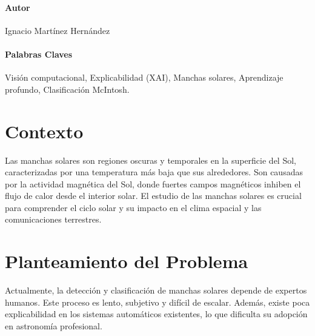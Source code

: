 \documentclass[conference]{IEEEtran}
\begin{document}

\paragraph*{Autor}{Ignacio Martínez Hernández}
\paragraph*{Palabras Claves}{Visión computacional, Explicabilidad (XAI), Manchas solares, Aprendizaje profundo, Clasificación McIntosh.}

\vspace{-1\baselineskip}

\section*{Contexto}
Las manchas solares son regiones oscuras y temporales en la superficie del Sol, caracterizadas por una temperatura más baja que sus alrededores. Son causadas por la actividad magnética del Sol, donde fuertes campos magnéticos inhiben el flujo de calor desde el interior solar. El estudio de las manchas solares es crucial para comprender el ciclo solar y su impacto en el clima espacial y las comunicaciones terrestres.

\section*{Planteamiento del Problema}

Actualmente, la detección y clasificación de manchas solares depende de expertos humanos. Este proceso es lento, subjetivo y difícil de escalar. Además, existe poca explicabilidad en los sistemas automáticos existentes, lo que dificulta su adopción en astronomía profesional.
\end{document}
